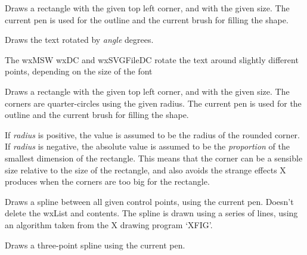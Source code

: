 Draws a rectangle with the given top left corner, and with the given
size.  The current pen is used for the outline and the current brush
for filling the shape.

\label{wxdcdrawrotatedtext}


Draws the text rotated by {\it angle} degrees.

The wxMSW wxDC and wxSVGFileDC rotate the text around slightly different points, depending on the size of the font

\label{wxdcdrawroundedrectangle}


Draws a rectangle with the given top left corner, and with the given
size.  The corners are quarter-circles using the given radius. The
current pen is used for the outline and the current brush for filling
the shape.

If {\it radius} is positive, the value is assumed to be the
radius of the rounded corner. If {\it radius} is negative,
the absolute value is assumed to be the {\it proportion} of the smallest
dimension of the rectangle. This means that the corner can be
a sensible size relative to the size of the rectangle, and also avoids
the strange effects X produces when the corners are too big for
the rectangle.

\label{wxdcdrawspline}


Draws a spline between all given control points, using the current
pen.  Doesn't delete the wxList and contents. The spline is drawn
using a series of lines, using an algorithm taken from the X drawing
program `XFIG'.


Draws a three-point spline using the current pen.

\label{wxdcdrawtext}


